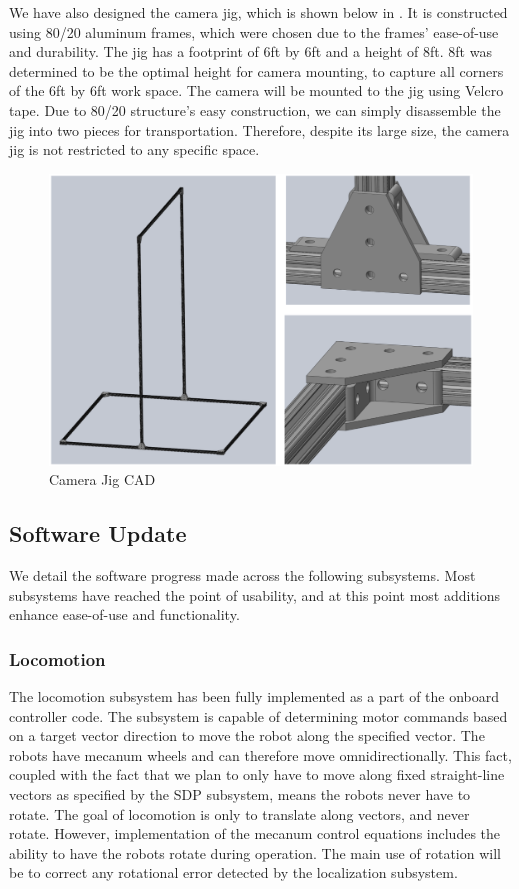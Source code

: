 We have also designed the camera jig, which is shown below in . It is constructed using 80/20 aluminum frames, which were chosen due to the frames’ ease-of-use and durability. The jig has a footprint of 6ft by 6ft and a height of 8ft. 8ft was determined to be the optimal height for camera mounting, to capture all corners of the 6ft by 6ft work space. The camera will be mounted to the jig using Velcro tape. Due to 80/20 structure’s easy construction, we can simply disassemble the jig into two pieces for transportation. Therefore, despite its large size, the camera jig is not restricted to any specific space.

\begin{figure}[h!]
\centering
\includegraphics[width=0.98\columnwidth]{figs/jig.png}
\caption{Camera Jig CAD}
\label{fig:em2}
\end{figure}

\subsection{Software Update}
\label{sec:software_progress}
We detail the software progress made across the following subsystems. Most subsystems have reached the point of usability, and at this point most additions enhance ease-of-use and functionality.


\subsubsection{Locomotion}
The locomotion subsystem has been fully implemented as a part of the onboard controller code. The subsystem is capable of determining motor commands based on a target vector direction to move the robot along the specified vector. The robots have mecanum wheels and can therefore move omnidirectionally. This fact, coupled with the fact that we plan to only have to move along fixed straight-line vectors as specified by the SDP subsystem, means the robots never have to rotate. The goal of locomotion is only to translate along vectors, and never rotate. However, implementation of the mecanum control equations includes the ability to have the robots rotate during operation. The main use of rotation will be to correct any rotational error detected by the localization subsystem.


